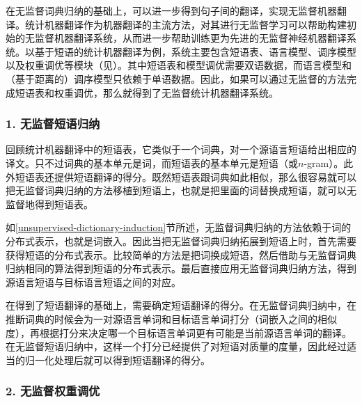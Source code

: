 \parinterval 在无监督词典归纳的基础上，可以进一步得到句子间的翻译，实现无监督机器翻译。统计机器翻译作为机器翻译的主流方法，对其进行无监督学习可以帮助构建初始的无监督机器翻译系统，从而进一步帮助训练更为先进的无监督神经机器翻译系统。以基于短语的统计机器翻译为例，系统主要包含短语表、语言模型、调序模型以及权重调优等模块（见{\chapterseven}）。其中短语表和模型调优需要双语数据，而语言模型和（基于距离的）调序模型只依赖于单语数据。因此，如果可以通过无监督的方法完成短语表和权重调优，那么就得到了无监督统计机器翻译系统。

\subsubsection{1. 无监督短语归纳}

\parinterval 回顾统计机器翻译中的短语表，它类似于一个词典，对一个源语言短语给出相应的译文。只不过词典的基本单元是词，而短语表的基本单元是短语（或$n$-gram）。此外短语表还提供短语翻译的得分。既然短语表跟词典如此相似，那么很容易就可以把无监督词典归纳的方法移植到短语上，也就是把里面的词替换成短语，就可以无监督地得到短语表。

\parinterval 如\ref{unsupervised-dictionary-induction}节所述，无监督词典归纳的方法依赖于词的分布式表示，也就是词嵌入。因此当把无监督词典归纳拓展到短语上时，首先需要获得短语的分布式表示。比较简单的方法是把词换成短语，然后借助与无监督词典归纳相同的算法得到短语的分布式表示。最后直接应用无监督词典归纳方法，得到源语言短语与目标语言短语之间的对应。

\parinterval 在得到了短语翻译的基础上，需要确定短语翻译的得分。在无监督词典归纳中，在推断词典的时候会为一对源语言单词和目标语言单词打分（词嵌入之间的相似度），再根据打分来决定哪一个目标语言单词更有可能是当前源语言单词的翻译。在无监督短语归纳中，这样一个打分已经提供了对短语对质量的度量，因此经过适当的归一化处理后就可以得到短语翻译的得分。

\subsubsection{2. 无监督权重调优}

